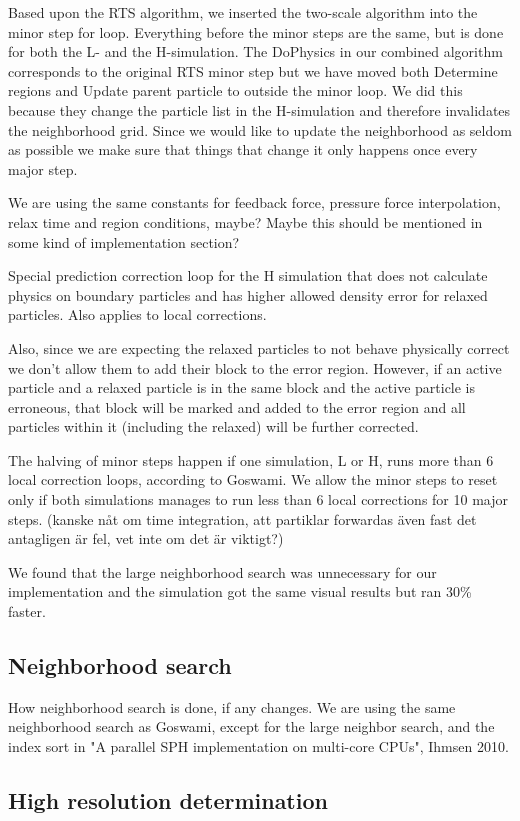 \documentclass[../../main.tex]{subfiles}
\begin{document}
Based upon the RTS algorithm, we inserted the two-scale algorithm into the minor step for loop. Everything before the minor steps are the same, but is done for both the L- and the H-simulation. The DoPhysics in our combined algorithm corresponds to the original RTS minor step but we have moved both Determine regions and Update parent particle to outside the minor loop. We did this because they change the particle list in the H-simulation and therefore invalidates the neighborhood grid. Since we would like to update the neighborhood as seldom as possible we make sure that things that change it only happens once every major step. 

We are using the same constants for feedback force, pressure force interpolation, relax time and region conditions, maybe? Maybe this should be mentioned in some kind of implementation section?

Special prediction correction loop for the H simulation that does not calculate physics on boundary particles and has higher allowed density error for relaxed particles. Also applies to local corrections. 

Also, since we are expecting the relaxed particles to not behave physically correct we don't allow them to add their block to the error region. However, if an active particle and a relaxed particle is in the same block and the active particle is erroneous, that block will be marked and added to the error region and all particles within it (including the relaxed) will be further corrected. 

The halving of minor steps happen if one simulation, L or H, runs more than 6 local correction loops, according to Goswami. We allow the minor steps to reset only if both simulations manages to run less than 6 local corrections for 10 major steps. (kanske nåt om time integration, att partiklar forwardas även fast det antagligen är fel, vet inte om det är viktigt?)

We found that the large neighborhood search was unnecessary for our implementation and the simulation got the same visual results but ran 30\% faster. 

\subsection{Neighborhood search}
{\color{red}How neighborhood search is done, if any changes.}
We are using the same neighborhood search as Goswami, except for the large neighbor search, and the index sort in "A parallel SPH implementation on multi-core CPUs", Ihmsen 2010. 

\subsection{High resolution determination}
\end{document}
